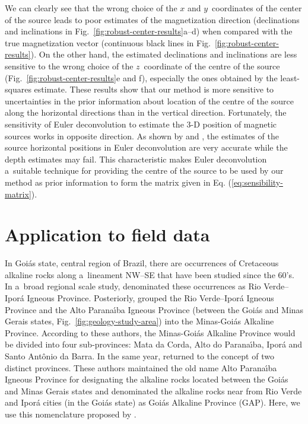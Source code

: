 \documentclass[journal abbreviation, npg]{copernicus}
\begin{document}
We can clearly see that the wrong choice of the $x$ and $y$~coordinates of
the center of the source leads to poor estimates of the magnetization
direction (declinations and inclinations in
Fig.~\ref{fig:robust-center-results}a--d) when compared with the true
magnetization vector (continuous black lines in
Fig.~\ref{fig:robust-center-results}). On the other hand, the estimated
declinations and inclinations are less sensitive to the wrong choice of the
$z$~coordinate of the centre of the source
(Fig.~\ref{fig:robust-center-results}e and f), especially the ones obtained
by the least-squares estimate. These results show that our method is more
sensitive to uncertainties in the prior information about location of the
centre of the source along the horizontal directions than in the vertical
direction. Fortunately, the sensitivity of Euler deconvolution to estimate
the 3-D position of magnetic sources works in opposite direction. As shown by
\citet{silva-barbosa2003} and \citet{melo-etal2013}, the estimates of the
source horizontal positions in Euler deconvolution are very accurate while
the depth estimates may fail. This characteristic makes Euler deconvolution
a~suitable technique for providing the centre of the source to be used by our
method as prior information to form the matrix given in Eq.
(\ref{eq:sensibility-matrix}).

\section{Application to field data}

In Goi\'{a}s state, central region of Brazil, there are occurrences of
Cretaceous alkaline rocks along a~lineament NW--SE that have been studied
since the 60's. In a~broad regional scale study, \citet{almeida1983}
denominated these occurrences as Rio Verde--Ipor\'{a} Igneous Province.
Posteriorly, \citet{sgarbi2002} grouped the Rio Verde--Ipor\'{a} Igneous
Province and the Alto Parana\'{\i}ba Igneous Province (between the Goi\'{a}s
and Minas Gerais states, Fig.~\ref{fig:geology-study-area}) into the
Minas-Goi\'{a}s Alkaline Province. According to these authors, the
Minas-Goi\'{a}s Alkaline Province would be divided into four sub-provinces:
Mata da Corda, Alto do Parana\'{\i}ba, Ipor\'{a} and Santo Ant\^{o}nio da
Barra. In the same year, \citet{junqueira-brod2002} returned to the concept
of two distinct provinces. These authors maintained the old name Alto
Parana\'{\i}ba Igneous Province for designating the alkaline rocks located
between the Goi\'{a}s and Minas Gerais states and denominated the alkaline
rocks near from Rio Verde and Ipor\'{a} cities (in the Goi\'{a}s state) as
Goi\'{a}s Alkaline Province (GAP). Here, we use this nomenclature proposed by
\citet{junqueira-brod2002}.
\end{document}

